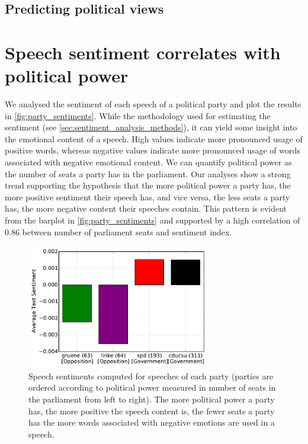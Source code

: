 \documentclass[runningheads,a4paper]{llncs}
\begin{document}
\subsection{Predicting political views}


\section{Speech sentiment correlates with political power}\label{sec:sentiment_result}
We analysed the sentiment of each speech of a political party and plot the results in \autoref{fig:party_sentiments}. While the methodology used for estimating the sentiment (see \autoref{sec:sentiment_analysis_methods}), it can yield some insight into the emotional content of a speech. High values indicate more pronounced usage of positive words, whereas negative values indicate more pronounced usage of words associated with negative emotional content. We can quantify political power as the number of seats a party has in the parliament. Our analyses show a strong trend supporting the hypothesis that the more political power a party has, the more positive sentiment their speech has, and vice versa, the less seats a party has, the more negative content their speeches contain. This pattern is evident from the barplot in \autoref{fig:party_sentiments} and supported by a high correlation of 0.86 between number of parliament seats and sentiment index.

\begin{figure}
\begin{center}
\includegraphics[width=8cm]{images/party-sentiments-18.pdf} 
%
\end{center}
\caption{
\label{fig:party_sentiments}
Speech sentiments computed for speeches of each party (parties are ordered according to political power measured in number of seats in the parliament from left to right). The more political power a party has, the more positive the speech content is, the fewer seats a party has the more words associated with negative emotions are used in a speech. 
}
\end{figure}
\end{document}
